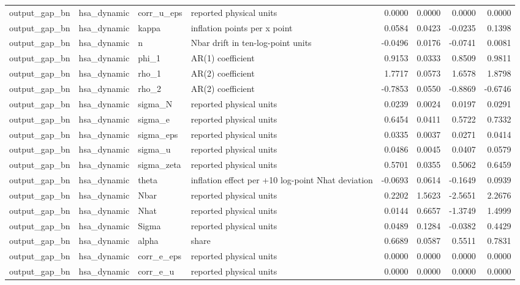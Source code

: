 \begin{tabular}{llllrrrr}
output\_gap\_bn & hsa\_dynamic & corr\_u\_eps & reported physical units & 0.0000 & 0.0000 & 0.0000 & 0.0000 \\
output\_gap\_bn & hsa\_dynamic & kappa & inflation points per x point & 0.0584 & 0.0423 & -0.0235 & 0.1398 \\
output\_gap\_bn & hsa\_dynamic & n & Nbar drift in ten-log-point units & -0.0496 & 0.0176 & -0.0741 & 0.0081 \\
output\_gap\_bn & hsa\_dynamic & phi\_1 & AR(1) coefficient & 0.9153 & 0.0333 & 0.8509 & 0.9811 \\
output\_gap\_bn & hsa\_dynamic & rho\_1 & AR(2) coefficient & 1.7717 & 0.0573 & 1.6578 & 1.8798 \\
output\_gap\_bn & hsa\_dynamic & rho\_2 & AR(2) coefficient & -0.7853 & 0.0550 & -0.8869 & -0.6746 \\
output\_gap\_bn & hsa\_dynamic & sigma\_N & reported physical units & 0.0239 & 0.0024 & 0.0197 & 0.0291 \\
output\_gap\_bn & hsa\_dynamic & sigma\_e & reported physical units & 0.6454 & 0.0411 & 0.5722 & 0.7332 \\
output\_gap\_bn & hsa\_dynamic & sigma\_eps & reported physical units & 0.0335 & 0.0037 & 0.0271 & 0.0414 \\
output\_gap\_bn & hsa\_dynamic & sigma\_u & reported physical units & 0.0486 & 0.0045 & 0.0407 & 0.0579 \\
output\_gap\_bn & hsa\_dynamic & sigma\_zeta & reported physical units & 0.5701 & 0.0355 & 0.5062 & 0.6459 \\
output\_gap\_bn & hsa\_dynamic & theta & inflation effect per +10 log-point Nhat deviation & -0.0693 & 0.0614 & -0.1649 & 0.0939 \\
output\_gap\_bn & hsa\_dynamic & Nbar & reported physical units & 0.2202 & 1.5623 & -2.5651 & 2.2676 \\
output\_gap\_bn & hsa\_dynamic & Nhat & reported physical units & 0.0144 & 0.6657 & -1.3749 & 1.4999 \\
output\_gap\_bn & hsa\_dynamic & Sigma & reported physical units & 0.0489 & 0.1284 & -0.0382 & 0.4429 \\
output\_gap\_bn & hsa\_dynamic & alpha & share & 0.6689 & 0.0587 & 0.5511 & 0.7831 \\
output\_gap\_bn & hsa\_dynamic & corr\_e\_eps & reported physical units & 0.0000 & 0.0000 & 0.0000 & 0.0000 \\
output\_gap\_bn & hsa\_dynamic & corr\_e\_u & reported physical units & 0.0000 & 0.0000 & 0.0000 & 0.0000 \\

\end{tabular}
